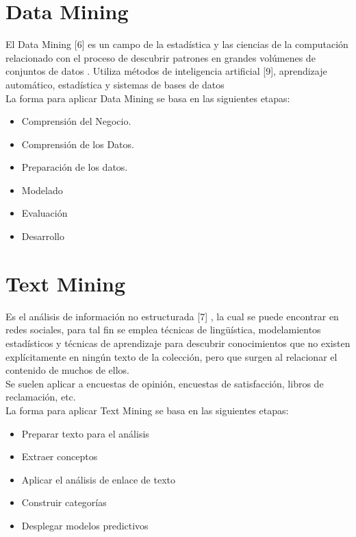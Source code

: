 	 	
		
		
		



\section{Data Mining}

El Data Mining [6] es un campo de la estad\'istica y las ciencias de la computaci\'on relacionado con el proceso de descubrir patrones en grandes vol\'umenes de conjuntos de datos . Utiliza m\'etodos de inteligencia artificial [9], aprendizaje autom\'atico, estad\'istica y sistemas de bases de datos \\	

La forma para aplicar Data Mining se basa en las siguientes etapas:

\begin{itemize}
\item Comprensión del Negocio.
\item Comprensión de los Datos.
\item Preparación de los datos.
\item Modelado
\item Evaluación 
\item Desarrollo
\end{itemize}

\section{Text Mining}

Es el an\'alisis de informaci\'on no estructurada [7] , la cual se puede encontrar en redes sociales, para tal fin se emplea t\'ecnicas de ling\"uística, modelamientos estad\'isticos y t\'ecnicas de aprendizaje para descubrir conocimientos que no existen explícitamente en ning\'un texto de la colecci\'on, pero que surgen al relacionar el contenido de muchos de ellos. \\

Se suelen aplicar a encuestas de opini\'on, encuestas de satisfacci\'on, libros de reclamaci\'on, etc. \\

La forma para aplicar Text Mining se basa en las siguientes etapas:

\begin{itemize}
\item Preparar texto para el análisis
\item Extraer conceptos
\item Aplicar el análisis de enlace de texto
\item Construir categorías
\item Desplegar modelos predictivos
\end{itemize}

